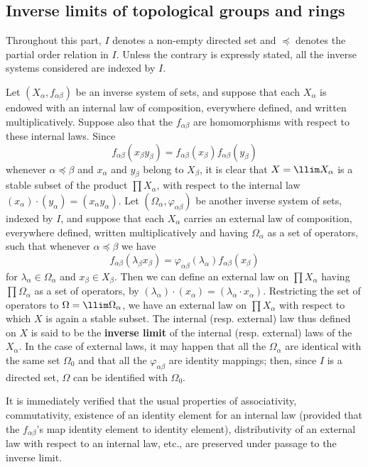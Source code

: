 \subsection{Inverse limits of topological groups and rings}
Throughout this part, $I$ denotes a non-empty directed set and $\preceq$ denotes the partial order relation in $I$. Unless the contrary is expressly stated, all the inverse systems considered are indexed by $I$.\par
Let $(X_\alpha,f_{\alpha\beta})$ be an inverse system of sets, and suppose that each $X_\alpha$ is endowed with an internal law of composition, everywhere defined, and written multiplicatively. Suppose also that the $f_{\alpha\beta}$ are homomorphisms with respect to these internal laws. Since
\[f_{\alpha\beta}(x_\beta y_\beta)=f_{\alpha\beta}(x_\beta)f_{\alpha\beta}(y_\beta)\]
whenever $\alpha\preceq\beta$ and $x_\alpha$ and $y_\beta$ belong to $X_\beta$, it is clear that $X=\llim X_\alpha$ is a stable subset of the product $\prod X_\alpha$, with respect to the internal law $(x_\alpha)\cdot (y_\alpha)=(x_\alpha y_\alpha)$. Let $(\Omega_\alpha,\varphi_{\alpha\beta})$ be another inverse system of sets, indexed by $I$, and suppose that each $X_\alpha$ carries an external law of composition, everywhere defined, written multiplicatively and having $\Omega_\alpha$ as a set of operators, such that whenever $\alpha\preceq\beta$ we have
\[f_{\alpha\beta}(\lambda_\beta x_\beta)=\varphi_{\alpha\beta}(\lambda_\alpha)f_{\alpha\beta}(x_\beta)\]
for $\lambda_\alpha\in\Omega_\alpha$ and $x_\beta\in X_\beta$. Then we can define an external law on $\prod X_\alpha$ having $\prod\Omega_\alpha$ as a set of operators, by $(\lambda_\alpha)\cdot(x_\alpha)=(\lambda_\alpha\cdot x_\alpha)$. Restricting the set of operators to $\Omega=\llim\Omega_\alpha$, we have an external law on $\prod X_\alpha$ with respect to which $X$ is again a stable subset. The internal (resp. external) law thus defined on $X$ is said to be the \textbf{inverse limit} of the internal (resp. external) laws of the $X_\alpha$. In the case of external laws, it may happen that all the $\Omega_\alpha$ are identical with the same set $\Omega_0$ and that all the $\varphi_{\alpha\beta}$ are identity mappings; then, since $I$ is a directed set, $\Omega$ can be identified with $\Omega_0$.\par
It is immediately verified that the usual properties of associativity, commutativity, existence of an identity element for an internal law (provided that the $f_{\alpha\beta}$'s map identity element to identity element), distributivity of an external law with respect to an internal law, etc., are preserved under passage to the inverse limit.\par
